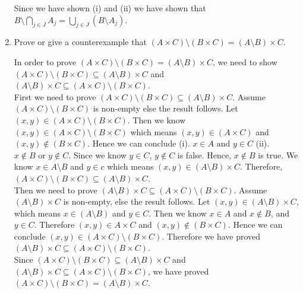 \documentclass{article}
\begin{document}
\begin{enumerate}
\noindent Since we have shown (i) and (ii) we  have shown that $ B \setminus \bigcap_{j \in J} A_j = \bigcup_{j \in J} (B \setminus A_j)$.\\

\item Prove or give a counterexample that $(A \times C) \setminus (B \times C )= (A \setminus B) \times C$. 
\bigskip
\vspace{.15in}

 In order to prove $(A \times C) \setminus (B \times C) = (A \setminus B) \times C$, we need to show $(A \times C) \setminus (B \times C) \subseteq (A \setminus B) \times C$ and $(A \setminus B) \times C \subseteq (A \times C) \setminus (B \times C)$.\\

First we need to prove $(A \times C) \setminus (B \times C) \subseteq (A \setminus B) \times C$. Assume $(A \times C) \setminus (B \times C)$ is non-empty else the result follows. Let $(x,y) \in (A \times C) \setminus (B \times C)$. Then we know $(x,y) \in (A \times C) \setminus (B \times C)$ which means $(x,y) \in (A \times C)$ and $(x,y) \notin (B \times C)$. Hence we can conclude (i). $x \in A \text{ and } y \in C$  (ii). $x \notin B \text{ or } y \notin C$. Since we know $y \in C$, $y \notin C$ is false. Hence, $x \notin B$ is true. We know $x \in A \setminus B$ and $y \in c$ which means $(x,y) \in (A \setminus B) \times C$. Therefore, $(A \times C) \setminus (B \times C) \subseteq (A \setminus B) \times C$.\\

Then we need to prove $(A \setminus B) \times C \subseteq (A \times C) \setminus (B \times C)$. Assume $(A \setminus B) \times C$ is non-empty, else the result follows. Let $(x, y) \in (A \setminus B) \times C$, which means $x \in (A \setminus B)$ and $y \in C$. Then we know $x \in A$ and $x \notin B$, and $y \in C$. Therefore $(x, y) \in A \times C$ and $(x, y) \notin (B \times C)$. Hence we can conclude $(x, y) \in (A \times C) \setminus (B \times C)$. Therefore we have proved  $(A \setminus B) \times C \subseteq (A \times C) \setminus (B \times C)$.\\

Since $(A \times C) \setminus (B \times C) \subseteq (A \setminus B) \times C$ and $(A \setminus B) \times C \subseteq (A \times C) \setminus (B \times C)$, we have proved $(A \times C) \setminus (B \times C) = (A \setminus B) \times C$.\\


\end{enumerate}
\end{document}
